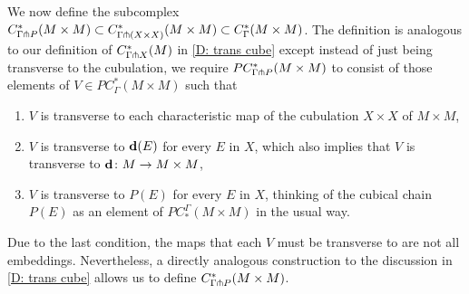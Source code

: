 We now define the subcomplex $C^*_{\Gamma \pitchfork P}(M \times M) \subset C^*_{\Gamma \pitchfork (X \times X)}(M \times M) \subset C^*_\Gamma(M \times M)$.
The definition is analogous to our definition of $C^*_{\Gamma \pitchfork X}(M)$ in \cref{D: trans cube} except instead of just being transverse to the cubulation, we require
$PC^*_{\Gamma \pitchfork P} (M \times M)$ to consist of those elements of $V \in PC^*_{\Gamma}(M \times M)$ such that
\begin{enumerate}
\item $V$ is transverse to each characteristic map of the cubulation $X \times X$ of $M \times M$,
\item $V$ is transverse to $\mathbf{d}(E)$ for every $E$ in $X$, which also implies that $V$ is transverse to $\mathbf{d} \colon M \to M \times M$,
\item $V$ is transverse to $P(E)$ for every $E$ in $X$, thinking of the cubical chain $P(E)$ as an element of $PC^\Gamma_*(M \times M)$ in the usual way.
\end{enumerate}

Due to the last condition, the maps that each $V$ must be transverse to are not all embeddings.
Nevertheless, a directly analogous construction to the discussion in \cref{D: trans cube} allows us to define $C^*_{\Gamma \pitchfork P} (M \times M)$.

